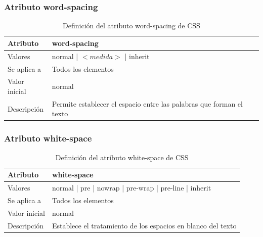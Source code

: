 \documentclass[ucs]{beamer}
\begin{document}
\begin{frame}
\frametitle{Atributo word-spacing}

\begin{center}
  \begin{table}
   \begin{tabular}{p{1.8cm}p{7.8cm}}
Atributo & \bf{word-spacing} \\ \hline
Valores& normal | $<medida>$ | inherit \\ \hline
Se aplica a& Todos los elementos \\ \hline
Valor inicial& normal \\ \hline
Descripción& Permite establecer el espacio entre las palabras que forman el texto \\ \hline
  \end{tabular}
   \caption{Definición del atributo word-spacing de CSS}
 \end{table}
\end{center}


\end{frame}



\begin{frame}
\frametitle{Atributo white-space}

\begin{center}
  \begin{table}
   \begin{tabular}{p{1.8cm}p{7.8cm}}
Atributo & \bf{white-space} \\ \hline
Valores& normal | pre | nowrap | pre-wrap | pre-line | inherit \\ \hline
Se aplica a& Todos los elementos \\ \hline
Valor inicial& normal \\ \hline
Descripción& Establece el tratamiento de los espacios en blanco del texto \\ \hline
  \end{tabular}
   \caption{Definición del atributo white-space de CSS}
 \end{table}
\end{center}


\end{frame}


\end{document}

